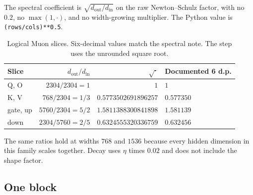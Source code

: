 \documentclass[11pt]{article}
\DeclareRobustCommand{\code}[1]{\texttt{#1}}
\begin{document}
The spectral coefficient is \(\sqrt{d_{\mathrm{out}}/d_{\mathrm{in}}}\) on
the raw Newton--Schulz factor, with no \(0.2\), no \(\max(1,\cdot)\), and no
width-growing multiplier. The Python value is \code{(rows/cols)**0.5}.

\begin{table}[t]
\centering
\caption{Logical Muon slices. Six-decimal values match the spectral note.
The step uses the unrounded square root.}
\label{tab:spectral}
\begin{tabular}{@{}lrrl@{}}
\toprule
Slice & \(d_{\mathrm{out}}/d_{\mathrm{in}}\) & \(\sqrt{\cdot}\) & Documented 6 d.p. \\
\midrule
Q, O & \(2304/2304=1\) & \(1\) & \(1\) \\
K, V & \(768/2304=1/3\) & \(0.5773502691896257\) & \(0.577350\) \\
gate, up & \(5760/2304=5/2\) & \(1.5811388300841898\) & \(1.581139\) \\
down & \(2304/5760=2/5\) & \(0.6324555320336759\) & \(0.632456\) \\
\bottomrule
\end{tabular}
\end{table}

The same ratios hold at widths \(768\) and \(1536\) because every hidden
dimension in this family scales together. Decay uses \(\eta\) times \(0.02\)
and does not include the shape factor.

\subsection{One block}
\end{document}
